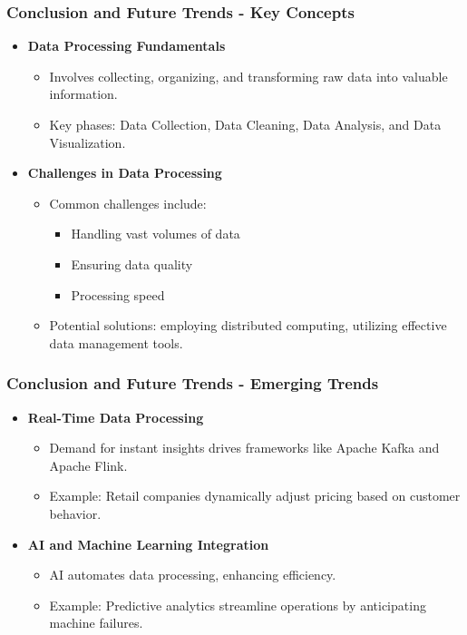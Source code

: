 \documentclass[aspectratio=169]{beamer}
\begin{document}
\begin{frame}[fragile]
    \frametitle{Conclusion and Future Trends - Key Concepts}
    \begin{itemize}
        \item \textbf{Data Processing Fundamentals}
            \begin{itemize}
                \item Involves collecting, organizing, and transforming raw data into valuable information.
                \item Key phases: Data Collection, Data Cleaning, Data Analysis, and Data Visualization.
            \end{itemize}
        
        \item \textbf{Challenges in Data Processing}
            \begin{itemize}
                \item Common challenges include:
                    \begin{itemize}
                        \item Handling vast volumes of data
                        \item Ensuring data quality
                        \item Processing speed
                    \end{itemize}
                \item Potential solutions: employing distributed computing, utilizing effective data management tools.
            \end{itemize}
    \end{itemize}
\end{frame}

\begin{frame}[fragile]
    \frametitle{Conclusion and Future Trends - Emerging Trends}
    \begin{itemize}
        \item \textbf{Real-Time Data Processing}
            \begin{itemize}
                \item Demand for instant insights drives frameworks like Apache Kafka and Apache Flink.
                \item Example: Retail companies dynamically adjust pricing based on customer behavior.
            \end{itemize}
        
        \item \textbf{AI and Machine Learning Integration}
            \begin{itemize}
                \item AI automates data processing, enhancing efficiency.
                \item Example: Predictive analytics streamline operations by anticipating machine failures.
            \end{itemize}
    \end{itemize}
\end{frame}
\end{document}

